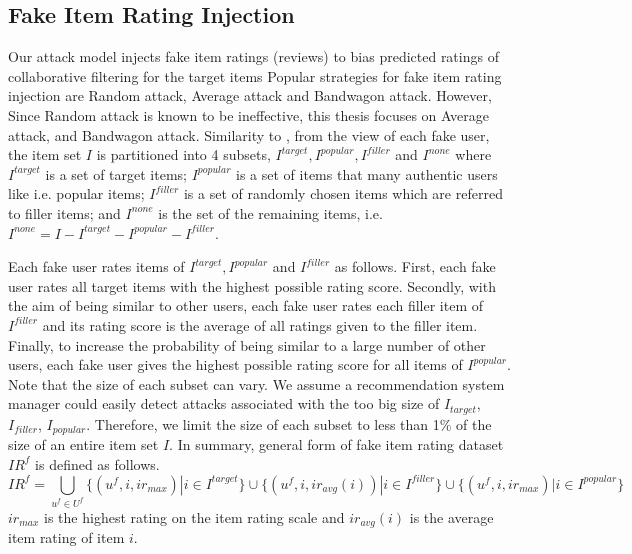 \documentclass[master,english,final]{kaist-ucs}
\begin{document}
\subsection{Fake Item Rating Injection}
Our attack model injects fake item ratings (reviews) to bias predicted ratings of collaborative filtering for the target items
Popular strategies for fake item rating injection are Random attack, Average attack and Bandwagon attack.
However, Since Random attack is known to be ineffective, this thesis focuses on Average attack, and Bandwagon attack.
Similarity to \cite{shilling_attack_guide}, from the view of each fake user, the item set $I$ is partitioned into 4 subsets, $I^{target},I^{popular},I^{filler}$  and $I^{none}$ where $I^{target}$ is a set of target items; $I^{popular}$ is a set of items that many authentic users like i.e. popular items; $I^{filler}$ is a set of randomly chosen items which are referred to filler items; and $I^{none}$ is the set of the remaining items, i.e. $I^{none}=I-I^{target}-I^{popular}-I^{filler}$.

Each fake user rates items of $I^{target},I^{popular}$ and $I^{filler}$ as follows.
First, each fake user rates all target items with the highest possible rating score.
Secondly, with the aim of being similar to other users, each fake user rates each filler item of $I^{filler}$ and its rating score is the average of all ratings given to the filler item.
Finally, to increase the probability of being similar to a large number of other users, each fake user gives the highest possible rating score for all items of $I^{popular}$.
Note that the size of each subset can vary.
We assume a recommendation system manager could easily detect attacks associated with the too big size of $I_{target}$, $I_{filler}$, $I_{popular}$.
Therefore, we limit the size of each subset to less than 1\% of the size of an entire item set $I$.
In summary, general form of fake item rating dataset $IR^f$ is defined as follows.
\begin{equation}
{IR}^f = \bigcup_{u^f \in U^f} \{(u^f,i,ir_{max}) | i \in I^{target} \} \cup \{(u^f,i,ir_{avg} {(i)}) | i \in I^{filler} \} \cup \{(u^f,i,ir_{max}) | i \in I^{popular} \}
\end{equation}
$ir_{max}$ is the highest rating on the item rating scale and $ir_{avg} {(i)}$ is the average item rating of item $i$.
\end{document}
